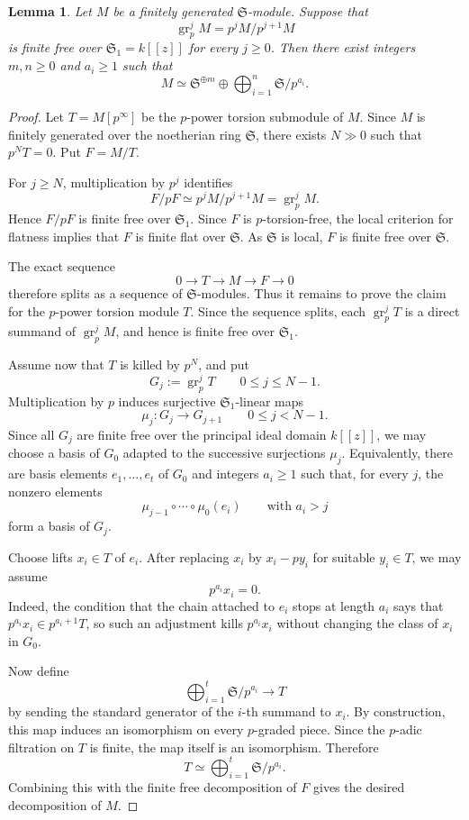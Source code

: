 \documentclass[11pt]{amsart}
\newtheorem{lemma}{Lemma}[section]
\numberwithin{equation}{section}
\newcommand{\mf}{\mathfrak}
\newcommand{\gr}{{\operatorname{gr}}}
\newcommand{\mS}{\mf{S}}
\numberwithin{equation}{section}
\begin{document}
\begin{lemma}\label{pelemcrit}
Let $M$ be a finitely generated $\mS$-module.  Suppose that
\[
  \gr_p^jM=p^jM/p^{j+1}M
\]
is finite free over $\mS_1=k[[z]]$ for every $j\geq 0$.  Then there exist
integers $m,n\geq 0$ and $a_i\geq 1$ such that
\[
  M\simeq
  \mS^{\oplus m}
  \oplus
  \bigoplus_{i=1}^n \mS/p^{a_i}.
\]
\end{lemma}

\begin{proof}
Let $T=M[p^\infty]$ be the $p$-power torsion submodule of $M$.  Since $M$ is
finitely generated over the noetherian ring $\mS$, there exists $N\gg 0$
such that $p^NT=0$.  Put $F=M/T$.

For $j\geq N$, multiplication by $p^j$ identifies
\[
  F/pF
  \simeq
  p^jM/p^{j+1}M
  =
  \gr_p^jM.
\]
Hence $F/pF$ is finite free over $\mS_1$.  Since $F$ is $p$-torsion-free,
the local criterion for flatness implies that $F$ is finite flat over
$\mS$.  As $\mS$ is local, $F$ is finite free over $\mS$.

The exact sequence
\[
  0\longrightarrow T\longrightarrow M\longrightarrow F\longrightarrow 0
\]
therefore splits as a sequence of $\mS$-modules.  Thus it remains to prove
the claim for the $p$-power torsion module $T$.  Since the sequence splits,
each $\gr_p^jT$ is a direct summand of $\gr_p^jM$, and hence is finite free
over $\mS_1$.

Assume now that $T$ is killed by $p^N$, and put
\[
  G_j:=\gr_p^jT
  \qquad
  0\leq j\leq N-1.
\]
Multiplication by $p$ induces surjective $\mS_1$-linear maps
\[
  \mu_j:G_j\longrightarrow G_{j+1}
  \qquad
  0\leq j<N-1.
\]
Since all $G_j$ are finite free over the principal ideal domain $k[[z]]$,
we may choose a basis of $G_0$ adapted to the successive surjections
$\mu_j$.  Equivalently, there are basis elements $e_1,\dots,e_t$ of $G_0$
and integers $a_i\geq 1$ such that, for every $j$, the nonzero elements
\[
  \mu_{j-1}\circ\cdots\circ\mu_0(e_i)
  \qquad
  \text{with } a_i>j
\]
form a basis of $G_j$.

Choose lifts $x_i\in T$ of $e_i$.  After replacing $x_i$ by $x_i-py_i$ for
suitable $y_i\in T$, we may assume
\[
  p^{a_i}x_i=0.
\]
Indeed, the condition that the chain attached to $e_i$ stops at length
$a_i$ says that $p^{a_i}x_i\in p^{a_i+1}T$, so such an adjustment kills
$p^{a_i}x_i$ without changing the class of $x_i$ in $G_0$.

Now define
\[
  \bigoplus_{i=1}^t \mS/p^{a_i}
  \longrightarrow
  T
\]
by sending the standard generator of the $i$-th summand to $x_i$.  By
construction, this map induces an isomorphism on every $p$-graded piece.
Since the $p$-adic filtration on $T$ is finite, the map itself is an
isomorphism.  Therefore
\[
  T\simeq \bigoplus_{i=1}^t \mS/p^{a_i}.
\]
Combining this with the finite free decomposition of $F$ gives the desired
decomposition of $M$.
\end{proof}
\end{document}
